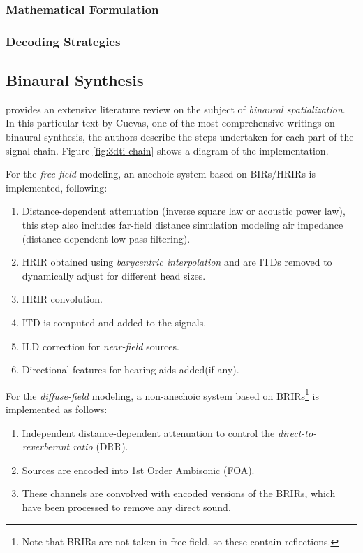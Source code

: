 \subsubsection{Mathematical Formulation}

\subsubsection{Decoding Strategies}


\subsection{Binaural Synthesis}
\label{subsec:bin-synth}

\cite{cuevas20193d} provides an extensive literature review on the subject of \textit{binaural spatialization}. In this particular text by Cuevas, one of the most comprehensive writings on binaural synthesis, the authors describe the steps undertaken for each part of the signal chain. Figure \ref{fig:3dti-chain} shows a diagram of the implementation. 

For the \textit{free-field} modeling, an anechoic system based on BIRs/HRIRs is implemented, following:


\begin{enumerate}
    \item Distance-dependent attenuation (inverse square law or acoustic power law), this step also includes far-field distance simulation modeling air impedance (distance-dependent low-pass filtering).
    \item HRIR obtained using \textit{barycentric interpolation} and are ITDs removed to dynamically adjust for different head sizes.
    \item HRIR convolution.
    \item ITD is computed and added to the signals.
    \item ILD correction for \textit{near-field} sources.
    \item Directional features for hearing aids added(if any).
\end{enumerate}

For the \textit{diffuse-field} modeling, a non-anechoic system based on BRIRs\footnote{Note that BRIRs are not taken in free-field, so these contain reflections.} is implemented as follows:

\begin{enumerate}
    \item Independent distance-dependent attenuation to control the \textit{direct-to-reverberant ratio} (DRR). 
    \item Sources are encoded into 1st Order Ambisonic (FOA).
    \item These channels are convolved with encoded versions of the BRIRs, which have been processed to remove any direct sound.
\end{enumerate}

